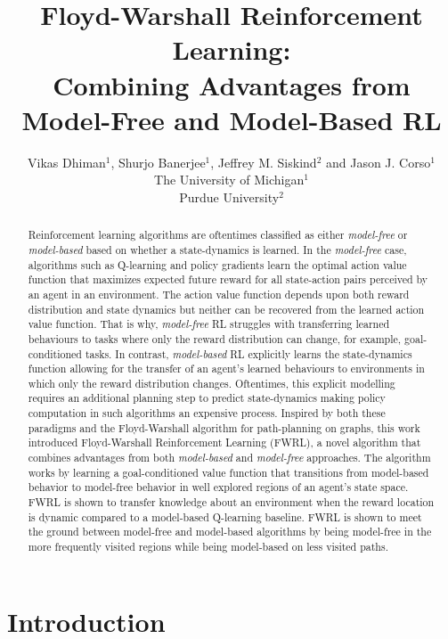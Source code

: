 \documentclass[letterpaper]{article} %
\title{Floyd-Warshall Reinforcement Learning: \\Combining Advantages from
Model-Free and Model-Based RL}
\author{Vikas Dhiman$^1$, Shurjo Banerjee$^1$, Jeffrey M. Siskind$^2$ and Jason J.
Corso$^1$\\
The University of Michigan$^1$\\
Purdue University$^2$}
\begin{document}
\maketitle
\begin{abstract}
Reinforcement learning algorithms are oftentimes classified as either
\emph{model-free} or \emph{model-based} based on whether a state-dynamics
is learned. In the \emph{model-free} case, algorithms such as
Q-learning and policy gradients learn the optimal action value function that
maximizes expected future reward for all state-action pairs perceived by an
agent in an environment.
The action value function depends upon both reward distribution and state
dynamics but neither can be recovered from the learned action value function.
That is why, \emph{model-free} RL struggles with transferring learned behaviours
to tasks where only the reward distribution can change, for example,
goal-conditioned tasks.
In contrast, \emph{model-based} RL explicitly learns the state-dynamics
function allowing for the transfer of an agent's learned behaviours to
environments in which only the reward distribution changes. Oftentimes,
this explicit modelling requires  an additional planning step to predict
state-dynamics making policy computation in such algorithms
an expensive process.  Inspired by both these paradigms and the
Floyd-Warshall algorithm for path-planning on graphs,  this work
introduced Floyd-Warshall Reinforcement Learning (FWRL), a novel
algorithm that combines advantages from both \emph{model-based} and
\emph{model-free} approaches.  The algorithm works by learning a
goal-conditioned value function that transitions from model-based
behavior to model-free behavior in well explored regions of an agent's
state space.  FWRL is shown to transfer knowledge about an environment
when the reward location is dynamic compared to a model-based Q-learning
baseline.  FWRL is shown to meet the ground between model-free and
model-based algorithms by being model-free in the more frequently
visited regions while being model-based on less visited paths.
\end{abstract}


\section{ Introduction}


\newpage\phantom{blabla}
\end{document}
